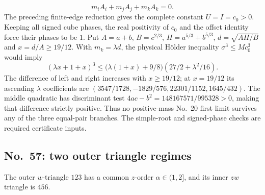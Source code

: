 \documentclass[11pt]{amsart}
\theoremstyle{remark}
\begin{document}
\begin{equation}\label{eq:no20-offsets}
m_iA_i+m_jA_j+m_kA_k=0.
\end{equation}
The preceding finite-edge reduction gives the complete constant $U=I=c_0>0$. Keeping all signed cube phases, the real positivity of $c_0$ and the offset identity force their phases to be $1$. Put $A=a+b$, $B=c^{2/3}$, $H=a^{5/3}+b^{5/3}$, $d=\sqrt{AH/B}$ and $x=d/A\ge19/12$. With $m_k=\lambda d$, the physical H\"older inequality $\sigma^3\le Mc_0^3$ would imply
\begin{equation}\label{eq:no20-holder-gap}
(\lambda x+1+x)^3\le\bigl(\lambda(1+x)+9/8\bigr)(27/2+\lambda^2/16).
\end{equation}
The difference of left and right increases with $x\ge19/12$; at $x=19/12$ its ascending $\lambda$ coefficients are $(3547/1728,-1829/576,22301/1152,1645/432)$. The middle quadratic has discriminant test $4ac-b^2=148167571/995328>0$, making that difference strictly positive. Thus no positive-mass No.~20 first limit survives any of the three equal-pair branches. The simple-root and signed-phase checks are required certificate inputs.

\subsection{No.~57: two outer triangle regimes}\label{sec:no57-triangle}
The outer $w$-triangle $123$ has a common $z$-order $\alpha\in(1,2]$, and its inner $zw$ triangle is $456$.
\end{document}
